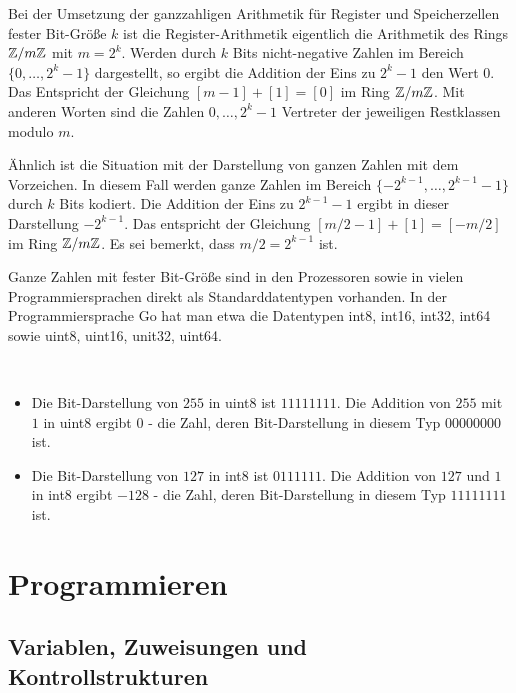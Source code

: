 \begin{bem}
		Bei der Umsetzung der ganzzahligen Arithmetik für Register und Speicherzellen fester Bit-Größe $k$ ist die Register-Arithmetik eigentlich die Arithmetik des Rings $\mathbb{Z} / m \mathbb{Z}$ mit $m=2^k$. Werden durch $k$ Bits nicht-negative Zahlen im Bereich $\{0,\ldots,2^k-1\}$ dargestellt, so ergibt die Addition der Eins zu $2^k-1$ den Wert $0$. Das Entspricht der Gleichung $[m-1] + [1] = [0]$ im Ring $\mathbb{Z} / m \mathbb{Z}$. Mit anderen Worten sind die Zahlen $0,\ldots,2^k-1$ Vertreter der jeweiligen Restklassen modulo $m$. 
		
		Ähnlich ist die Situation mit der Darstellung von ganzen Zahlen mit dem Vorzeichen. In diesem Fall werden ganze Zahlen im Bereich  $\{-2^{k-1},\ldots,2^{k-1}  - 1\}$ durch $k$ Bits kodiert. Die Addition der Eins zu $2^{k-1}-1$ ergibt in dieser Darstellung $-2^{k-1}$. Das entspricht der Gleichung $[m/2-1] + [1] =[-m/2]$ im Ring $\mathbb{Z} / m \mathbb{Z}$. Es sei bemerkt, dass  $m/2=2^{k-1}$ ist.
		
		Ganze Zahlen mit fester Bit-Größe sind in den Prozessoren sowie in vielen Programmiersprachen direkt als Standarddatentypen vorhanden. In der Programmiersprache Go hat man etwa die Datentypen int8, int16, int32, int64 sowie uint8, uint16, unit32, uint64. 
\end{bem} 

\begin{bsp}\ 
	\begin{itemize} 
		\item Die Bit-Darstellung von $255$ in uint8 ist $11111111$. Die Addition von $255$ mit $1$ in uint8 ergibt $0$ - die Zahl, deren Bit-Darstellung in diesem Typ $00000000$ ist.  
		\item Die Bit-Darstellung von $127$ in int8 ist $0111111$. Die Addition von $127$ und $1$ in int8 ergibt $-128$ - die Zahl, deren Bit-Darstellung in diesem Typ $11111111$ ist. 
	\end{itemize} 
\end{bsp}


\section{Programmieren} 

\subsection{Variablen, Zuweisungen und Kontrollstrukturen}

